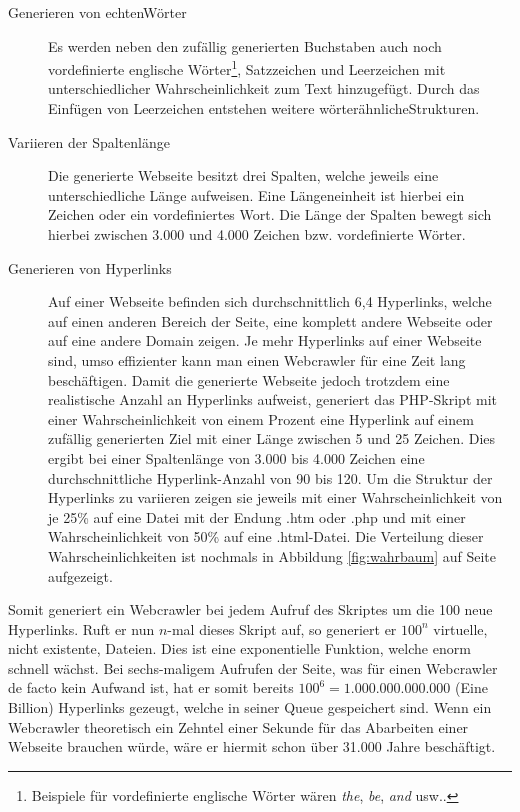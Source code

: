 \begin{description}
	\item[Generieren von \grqq echten\grqq\space Wörter] Es werden neben den zufällig generierten Buchstaben auch noch vordefinierte englische Wörter\footnote{Beispiele für vordefinierte englische Wörter wären \emph{the}, \emph{be}, \emph{and} usw..}, Satzzeichen und Leerzeichen mit unterschiedlicher Wahrscheinlichkeit zum Text hinzugefügt. Durch das Einfügen von Leerzeichen entstehen weitere \grqq wörterähnliche\grqq\space Strukturen.
	\item[Variieren der Spaltenlänge] Die generierte Webseite besitzt drei Spalten, welche jeweils eine unterschiedliche Länge aufweisen. Eine Längeneinheit ist hierbei ein Zeichen oder ein vordefiniertes Wort. Die Länge der Spalten bewegt sich hierbei zwischen 3.000 und 4.000 Zeichen bzw. vordefinierte Wörter.\\
	\item[Generieren von Hyperlinks] Auf einer Webseite befinden sich durchschnittlich 6,4 Hyperlinks, welche auf einen anderen Bereich der Seite, eine komplett andere Webseite oder auf eine andere Domain zeigen\cite{tarpitting-http-linux-mag}. Je mehr Hyperlinks auf einer Webseite sind, umso effizienter kann man einen Webcrawler für eine Zeit lang \glqq beschäftigen\grqq . Damit die generierte Webseite jedoch trotzdem eine realistische Anzahl an Hyperlinks aufweist, generiert das PHP-Skript mit einer Wahrscheinlichkeit von einem Prozent eine Hyperlink auf einem zufällig generierten Ziel mit einer Länge zwischen 5 und 25 Zeichen. Dies ergibt bei einer Spaltenlänge von 3.000 bis 4.000 Zeichen eine durchschnittliche Hyperlink-Anzahl von 90 bis 120. Um die Struktur der Hyperlinks zu variieren zeigen sie jeweils mit einer Wahrscheinlichkeit von je 25\% auf eine Datei mit der Endung .htm oder .php und mit einer Wahrscheinlichkeit von 50\% auf eine .html-Datei. Die Verteilung dieser Wahrscheinlichkeiten ist nochmals in Abbildung \ref{fig:wahrbaum} auf Seite \pageref{fig:wahrbaum} aufgezeigt.
\end{description}
Somit generiert ein Webcrawler bei jedem Aufruf des Skriptes um die 100 neue Hyperlinks. Ruft er nun $n$-mal dieses Skript auf, so generiert er $100^n$ virtuelle, nicht existente, Dateien. Dies ist eine exponentielle Funktion, welche enorm schnell wächst. Bei sechs-maligem Aufrufen der Seite, was für einen Webcrawler de facto kein Aufwand ist, hat er somit bereits $100^6 = 1.000.000.000.000$ (Eine Billion) Hyperlinks gezeugt, welche in seiner Queue gespeichert sind. Wenn ein Webcrawler theoretisch ein Zehntel einer Sekunde für das Abarbeiten einer Webseite brauchen würde, wäre er hiermit schon über 31.000 Jahre beschäftigt.\\
